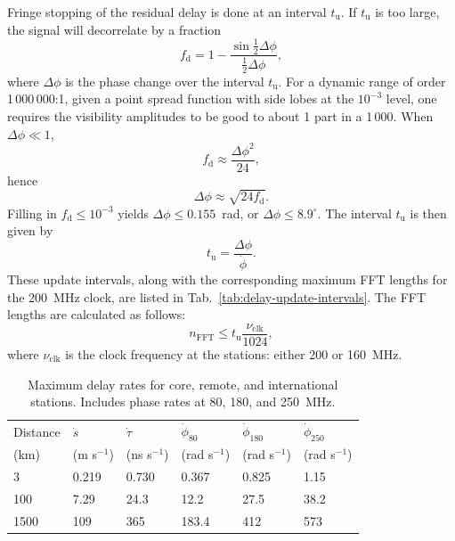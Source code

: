 \documentclass[a4paper,twoside]{article}
\begin{document}
Fringe stopping of the residual delay is done at an interval
$t_\mathrm{u}$. If $t_\mathrm{u}$ is too large, the signal will
decorrelate by a fraction
\begin{equation}
f_\mathrm{d} = 1 - \frac{\sin \frac{1}{2}\Delta\phi}{\frac{1}{2}\Delta\phi},
\end{equation}
where $\Delta\phi$ is the phase change over the interval
$t_\mathrm{u}$. For a dynamic range of order 1\,000\,000:1, given a
point spread function with side lobes at the $10^{-3}$ level, one
requires the visibility amplitudes to be good to about 1 part in a
1\,000. When $\Delta\phi \ll 1$,
\begin{equation}
f_\mathrm{d} \approx \frac{\Delta\phi^2}{24},
\label{eq:decorrelation-fraction}
\end{equation}
hence
\begin{equation}
\Delta\phi \approx \sqrt{24 f_\mathrm{d}}.
\end{equation}
Filling in $f_\mathrm{d} \le 10^{-3}$ yields $\Delta\phi \le
0.155$~rad, or $\Delta\phi \le 8.9^\circ$. The interval $t_\mathrm{u}$
is then given by
\begin{equation}
t_\mathrm{u} = \frac{\Delta \phi}{\dot{\phi}}.
\end{equation}
These update intervals, along with the corresponding maximum FFT lengths for
the 200~MHz clock, are listed in
Tab.~\ref{tab:delay-update-intervals}. The FFT lengths are calculated
as follows:
\begin{equation}
n_\mathrm{FFT} \le t_\mathrm{u}\frac{\nu_\mathrm{clk}}{1024},
\label{eq:fft-length}
\end{equation}
where $\nu_\mathrm{clk}$ is the clock frequency at the stations:
either 200 or 160~MHz.



\begin{table}
\caption{Maximum delay rates for core, remote, and international
  stations. Includes phase rates at 80, 180, and
  250~MHz.}
\begin{center}
\begin{tabular}{l|lllll}
\hline
\hline
Distance & $\dot{s}$    & $\dot{\tau}$   & $\dot{\phi}_{80}$ & $\dot{\phi}_{180}$ & $\dot{\phi}_{250}$ \\
 (km)    &  (m s$^{-1}$) &  (ns s$^{-1}$) & (rad s$^{-1}$)    & (rad s$^{-1}$)     & (rad s$^{-1}$)     \\
\hline
3        & 0.219        & 0.730          & 0.367            & 0.825             & 1.15              \\
100      & 7.29         & 24.3           & 12.2             & 27.5              & 38.2              \\
1500     & 109          & 365            & 183.4            & 412               & 573               \\
\hline
\hline
\end{tabular}
\end{center}
\end{table}
\end{document}

